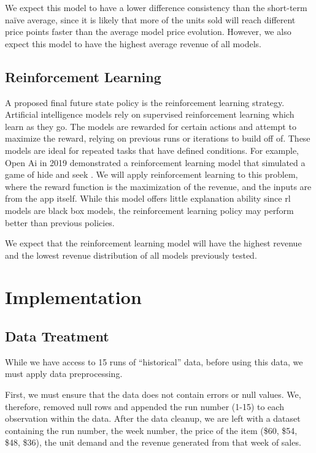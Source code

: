 \documentclass[11pt,a4paper]{article}
\begin{document}
We expect this model to have a lower difference consistency than the short-term naïve average, since it is likely that more of the units sold will reach different price points faster than the average model price evolution. 
However, we also expect this model to have the highest average revenue of all models.

\subsection{Reinforcement Learning}
A proposed final future state policy is the reinforcement learning strategy. 
Artificial intelligence models rely on supervised reinforcement learning which learn as they go. 
The models are rewarded for certain actions and attempt to maximize the reward, relying on previous runs or iterations to build off of. 
These models are ideal for repeated tasks that have defined conditions. For example, Open Ai in 2019 demonstrated a reinforcement learning model that simulated a game of hide and seek \cite{baker2019emergent}. 
We will apply reinforcement learning to this problem, where the reward function is the maximization of the revenue, and the inputs are from the app itself. 
While this model offers little explanation ability since rl models are black box models, the reinforcement learning policy may perform better than previous policies.

We expect that the reinforcement learning model will have the highest revenue and the lowest revenue distribution of all models previously tested.

\section{Implementation}

\subsection{Data Treatment}
While we have access to 15 runs of “historical” data, before using this data, we must apply data preprocessing.
\pagebreak

First, we must ensure that the data does not contain errors or null values. 
We, therefore, removed null rows and appended the run number (1-15) to each observation within the data. 
After the data cleanup, we are left with a dataset containing the run number, the week number, the price of the item (\$60, \$54, \$48, \$36), the unit demand and the revenue generated from that week of sales.
\end{document}
